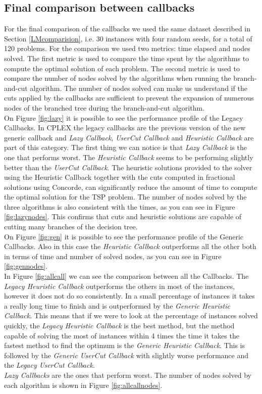 \subsection{Final comparison between callbacks}
\label{callbackresults}
For the final comparison of the callbacks we used the same dataset described in Section \ref{LMcomparision}, i.e. 30 instances with four random seeds, for a total of 120 problems.
For the comparison we used two metrics: time elapsed and nodes solved. The first metric is used to compare the time spent by the algorithms to compute the optimal solution of each problem. The second metric is used to compare the number of nodes solved by the algorithms when running the branch-and-cut algorithm. The number of nodes solved can make us understand if the cuts applied by the callbacks are sufficient to prevent the expansion of numerous nodes of the branched tree during the branch-and-cut algorithm. \\
On Figure \ref{fig:lazy} it is possible to see the performance profile of the Legacy Callbacks. In CPLEX the legacy callbacks are the previous version of the new generic callback and \textit{Lazy Callback}, \textit{UserCut Callback} and \textit{Heuristic Callback} are part of this category. The first thing we can notice is that \textit{Lazy Callback} is the one that performs worst. The \textit{Heuristic Callback} seems to be performing slightly better than the \textit{UserCut Callback}. The heuristic solutions provided to the solver using the Heuristic Callback together with the cuts computed in fractional solutions using Concorde, can significantly reduce the amount of time to compute the optimal solution for the TSP problem. The number of nodes solved by the three algorithms is also consistent with the times, as you can see in Figure \ref{fig:lazynodes}. This confirms that cuts and heuristic solutions are capable of cutting many branches of the decision tree. \\
On Figure \ref{fig:gen} it is possible to see the performance profile of the Generic Callbacks. Also in this case the \textit{Heuristic Callback} outperforms all the other both in terms of time and number of solved nodes, as you can see in Figure \ref{fig:gennodes}. \\
In Figure \ref{fig:allcall} we can see the comparison between all the Callbacks. The \textit{Legacy Heuristic Callback} outperforms the others in most of the instances, however it does not do so consistently. In a small percentage of instances it takes a really long time to finish and is outperformed by the \textit{Generic Heuristic Callback}. This means that if we were to look at the percentage of instances solved quickly, the \textit{Legacy Heuristic Callback} is the best method, but the method capable of solving the most of instances within 4 times the time it takes the fastest method to find the optimum is the \textit{Generic Heuristic Callback}. This is followed by the \textit{Generic UserCut Callback} with slightly worse performance and the \textit{Legacy UserCut Callback}.\\ \textit{Lazy Callbacks} are the ones that perform worst. The number of nodes solved by each algorithm is shown in Figure \ref{fig:allcallnodes}. \\
